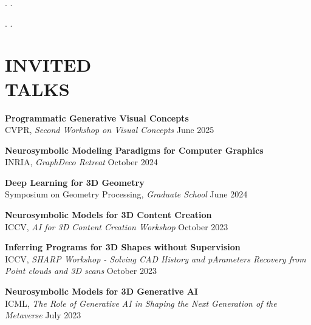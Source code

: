 \documentclass[line,margin]{res}
\begin{document}
\begin{resume}
. 
.

. 
.




\section{INVITED\\TALKS}

\newcommand{\talktitle}[1]{
	\textbf{#1}
}
\newcommand{\talk}[3]{
	#1, \emph{#2} \hfill #3
}

\talktitle{Programmatic Generative Visual Concepts}\\
\talk
	{CVPR}
	{Second Workshop on Visual Concepts}
	{June 2025}

\talktitle{Neurosymbolic Modeling Paradigms for Computer Graphics}\\
\talk
	{INRIA}
	{GraphDeco Retreat}
	{October 2024}

\talktitle{Deep Learning for 3D Geometry}\\
\talk
	{Symposium on Geometry Processing}
	{Graduate School}
	{June 2024}

\talktitle{Neurosymbolic Models for 3D Content Creation}\\
\talk
	{ICCV}
	{AI for 3D Content Creation Workshop}
	{October 2023}

\talktitle{Inferring Programs for 3D Shapes without Supervision}\\
\talk
	{ICCV}
	{SHARP Workshop - Solving CAD History and pArameters Recovery from Point clouds and 3D scans}
	{October 2023}

\talktitle{Neurosymbolic Models for 3D Generative AI}\\
\talk
	{ICML}
	{The Role of Generative AI in Shaping the Next Generation of the Metaverse}
	{July 2023}


\end{resume}
\end{document}
